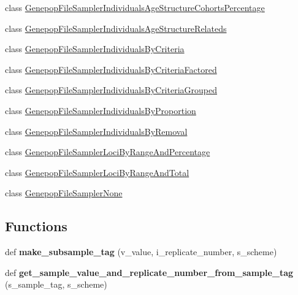 \begin{DoxyCompactItemize}
class \hyperlink{classnegui_1_1genepopfilesampler_1_1GenepopFileSamplerIndividualsAgeStructureCohortsPercentage}{Genepop\+File\+Sampler\+Individuals\+Age\+Structure\+Cohorts\+Percentage}
\item 
class \hyperlink{classnegui_1_1genepopfilesampler_1_1GenepopFileSamplerIndividualsAgeStructureRelateds}{Genepop\+File\+Sampler\+Individuals\+Age\+Structure\+Relateds}
\item 
class \hyperlink{classnegui_1_1genepopfilesampler_1_1GenepopFileSamplerIndividualsByCriteria}{Genepop\+File\+Sampler\+Individuals\+By\+Criteria}
\item 
class \hyperlink{classnegui_1_1genepopfilesampler_1_1GenepopFileSamplerIndividualsByCriteriaFactored}{Genepop\+File\+Sampler\+Individuals\+By\+Criteria\+Factored}
\item 
class \hyperlink{classnegui_1_1genepopfilesampler_1_1GenepopFileSamplerIndividualsByCriteriaGrouped}{Genepop\+File\+Sampler\+Individuals\+By\+Criteria\+Grouped}
\item 
class \hyperlink{classnegui_1_1genepopfilesampler_1_1GenepopFileSamplerIndividualsByProportion}{Genepop\+File\+Sampler\+Individuals\+By\+Proportion}
\item 
class \hyperlink{classnegui_1_1genepopfilesampler_1_1GenepopFileSamplerIndividualsByRemoval}{Genepop\+File\+Sampler\+Individuals\+By\+Removal}
\item 
class \hyperlink{classnegui_1_1genepopfilesampler_1_1GenepopFileSamplerLociByRangeAndPercentage}{Genepop\+File\+Sampler\+Loci\+By\+Range\+And\+Percentage}
\item 
class \hyperlink{classnegui_1_1genepopfilesampler_1_1GenepopFileSamplerLociByRangeAndTotal}{Genepop\+File\+Sampler\+Loci\+By\+Range\+And\+Total}
\item 
class \hyperlink{classnegui_1_1genepopfilesampler_1_1GenepopFileSamplerNone}{Genepop\+File\+Sampler\+None}
\end{DoxyCompactItemize}
\subsection*{Functions}
\begin{DoxyCompactItemize}
\item 
def {\bfseries make\+\_\+subsample\+\_\+tag} (v\+\_\+value, i\+\_\+replicate\+\_\+number, s\+\_\+scheme)\hypertarget{namespacenegui_1_1genepopfilesampler_a1bc84ad362bf9aa4a57f568fd740171e}{}\label{namespacenegui_1_1genepopfilesampler_a1bc84ad362bf9aa4a57f568fd740171e}

\item 
def {\bfseries get\+\_\+sample\+\_\+value\+\_\+and\+\_\+replicate\+\_\+number\+\_\+from\+\_\+sample\+\_\+tag} (s\+\_\+sample\+\_\+tag, s\+\_\+scheme)\hypertarget{namespacenegui_1_1genepopfilesampler_add6542ca0344658bb772d671ef34d761}{}\label{namespacenegui_1_1genepopfilesampler_add6542ca0344658bb772d671ef34d761}

\end{DoxyCompactItemize}

